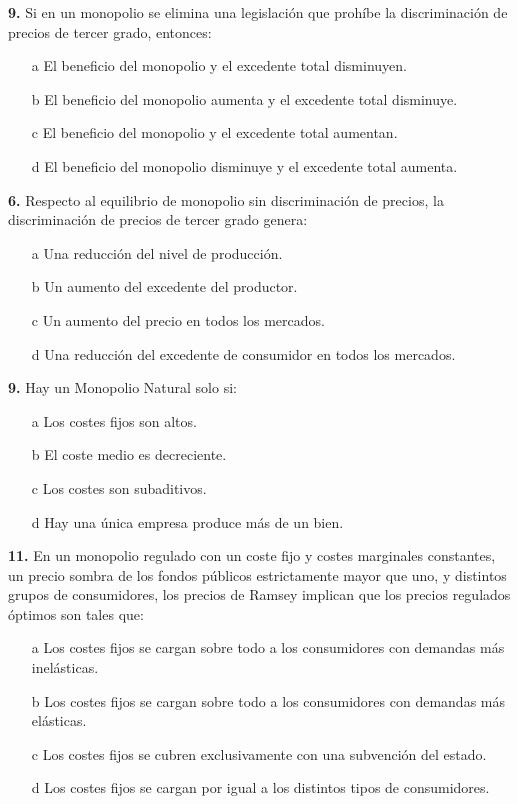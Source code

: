 \documentclass{nuevotema}
\begin{document}
\textbf{9.} Si en un monopolio se elimina una legislación que prohíbe la discriminación de precios de tercer grado, entonces:
\begin{enumerate}
	\item[a] El beneficio del monopolio y el excedente total disminuyen.
	\item[b] El beneficio del monopolio aumenta y el excedente total disminuye.
	\item[c] El beneficio del monopolio y el excedente total aumentan.
	\item[d] El beneficio del monopolio disminuye y el excedente total aumenta.
\end{enumerate}


\textbf{6.} Respecto al equilibrio de monopolio sin discriminación de precios, la discriminación de precios de tercer grado genera:
\begin{enumerate}
	\item[a] Una reducción del nivel de producción.
	\item[b] Un aumento del excedente del productor.
	\item[c] Un aumento del precio en todos los mercados.
	\item[d] Una reducción del excedente de consumidor en todos los mercados.
\end{enumerate}

\textbf{9.} Hay un Monopolio Natural solo si:
\begin{enumerate}
	\item[a] Los costes fijos son altos.
	\item[b] El coste medio es decreciente.
	\item[c] Los costes son subaditivos.
	\item[d] Hay una única empresa produce más de un bien.
\end{enumerate}


\textbf{11.} En un monopolio regulado con un coste fijo y costes marginales constantes, un precio sombra de los fondos públicos estrictamente mayor que uno, y  distintos grupos de consumidores, los precios de Ramsey implican que los precios regulados óptimos son tales que:
\begin{enumerate}
	\item[a] Los costes fijos se cargan sobre todo a los consumidores con demandas más inelásticas.
	\item[b] Los costes fijos se cargan sobre todo a los consumidores con demandas más elásticas.
	\item[c] Los costes fijos se cubren exclusivamente con una subvención del estado.
	\item[d] Los costes fijos se cargan por igual a los distintos tipos de consumidores.
\end{enumerate}
\end{document}
